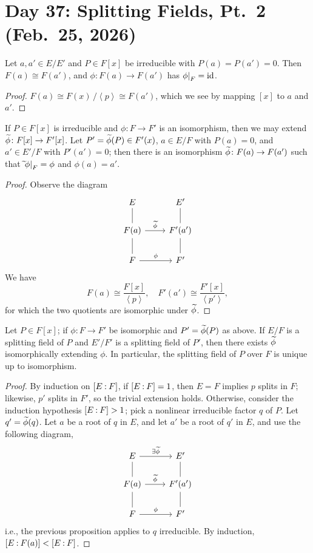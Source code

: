 \section{Day 37: Splitting Fields, Pt.\ 2 (Feb.\ 25, 2026)}
\begin{proposition}
    Let $a, a' \in E/E'$ and $P \in F[x]$ be irreducible with $P(a) = P(a') = 0$. Then $F(a) \cong F(a')$, and $\phi \colon F(a) \to F(a')$ has $\restr{\phi}{F} = \id$.
\end{proposition}
\begin{proof}
    $F(a) \cong F(x) \,/\! \left<p\right> \cong F(a')$, which we see by mapping $[x]$ to $a$ and $a'$.
\end{proof}
\begin{proposition}
    If $P \in F[x]$ is irreducible and $\phi \colon F \to F'$ is an isomorphism, then we may extend $\widetilde \phi \colon F[x] \to F'[x]$. Let $P' = \widetilde \phi(P) \in F'(x)$, $a \in E/F$ with $P(a) = 0$, and $a' \in E'/F$ with $P'(a') = 0$; then there is an isomorphism $\widetilde \phi \colon F(a) \to F(a')$ such that $\wt \, \restr{\phi}{F} = \phi$ and $\phi(a) = a'$.
\end{proposition}
\begin{proof}
    Observe the diagram
    \[ \begin{tikzcd}
        E & E' \\
        F(a) \arrow[u, dash] \arrow[r, "\wt \phi"] \arrow[d, dash] & F'(a') \arrow[u, dash] \arrow[d, dash] \\ F \arrow[r, "\phi"] & F'
    \end{tikzcd} \]
    We have
    \[ F(a) \cong \frac{F[x]}{\left<p\right>}, \quad F'(a') \cong \frac{F'[x]}{\left<p'\right>}, \]
    for which the two quotients are isomorphic under $\widetilde \phi$.
\end{proof}
\begin{theorem}
    Let $P \in F[x]$; if $\phi \colon F \to F'$ be isomorphic and $P' = \widetilde \phi(P)$ as above. If $E/F$ is a splitting field of $P$ and $E'/F'$ is a splitting field of $P'$, then there exists $\widetilde \phi$ isomorphically extending $\phi$. In particular, the splitting field of $P$ over $F$ is unique up to isomorphism.
\end{theorem}
\begin{proof}
    By induction on $\coor{E:F}$, if $\coor{E:F} = 1$, then $E = F$ implies $p$ splits in $F$; likewise, $p'$ splits in $F'$, so the trivial extension holds. Otherwise, consider the induction hypothesis $\coor{E:F} > 1$; pick a nonlinear irreducible factor $q$ of $P$. Let $q' = \widetilde \phi(q)$. Let $a$ be a root of $q$ in $E$, and let $a'$ be a root of $q'$ in $E$, and use the following diagram,
    \[ \begin{tikzcd}
        E \arrow[r, "\exists \wt \phi"] & E' \\
        F(a) \arrow[u, dash] \arrow[r, "\wt \phi"] \arrow[d, dash] & F'(a') \arrow[u, dash] \arrow[d, dash] \\ F \arrow[r, "\phi"] & F'
    \end{tikzcd} \]
    i.e., the previous proposition applies to $q$ irreducible. By induction, $\coor{E:F(a)} < \coor{E:F}$.
\end{proof}

